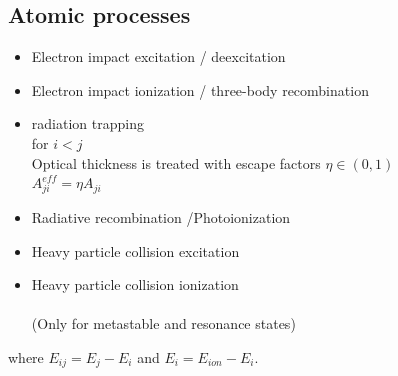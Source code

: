 \subsection{Atomic processes} \label{sec:processes}
\begin{itemize}
    \item Electron impact excitation / deexcitation \\  
    \item Electron impact ionization / three-body recombination \\  

    \item radiation trapping \\   for ${i<j}$  
    \\ Optical thickness is treated with escape factors $\eta \in (0,1)$ \\ $A^{eff}_{ji} = \eta A_{ji}$

    
    \item Radiative recombination /Photoionization \\ 

    \item Heavy particle collision excitation \\   

    \item Heavy particle collision ionization \\  
      \\    
     (Only for metastable and resonance states)  




\end{itemize}

\noindent where $E_{ij} = E_j - E_i$ and $E_{i} = E_{ion} - E_i$.




